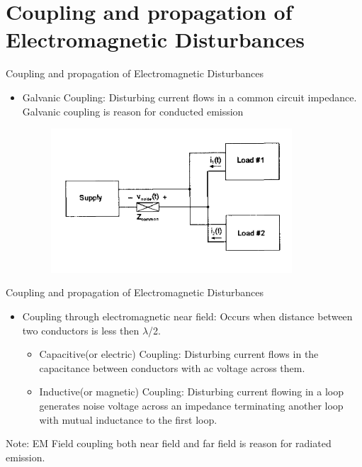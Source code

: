 \documentclass{beamer}
\begin{document}
\section{Coupling and propagation of Electromagnetic Disturbances} 
\begin{frame}{Coupling and propagation of Electromagnetic Disturbances}
\begin{itemize}
  \item Galvanic Coupling: Disturbing current flows
in a common circuit impedance. Galvanic coupling is reason for conducted emission 
\begin{figure}[ht!]
\includegraphics[width=90mm]{FIG_1.png}
\end{figure}
\end{itemize}
\end{frame}

\begin{frame}{Coupling and propagation of Electromagnetic Disturbances}
\begin{itemize}
\item Coupling through electromagnetic near field: Occurs when distance between two conductors is less then $\lambda$/2.
	\begin{itemize}
	\item Capacitive(or electric) Coupling: Disturbing current flows in the capacitance between conductors with ac voltage across them.
	\item Inductive(or magnetic) Coupling: Disturbing current flowing in a loop generates noise voltage across an impedance terminating another loop with mutual inductance to the first loop.
	\end{itemize} 
\end{itemize}
Note: EM Field coupling both near field and far field is reason for radiated emission.
\end{frame}
\end{document}
